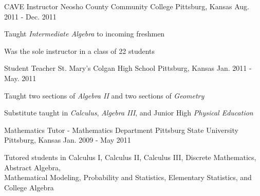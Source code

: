 \begin{cventries}
  \cventry
    {CAVE Instructor}
    {Neosho County Community College}
    {Pittsburg, Kansas}
    {Aug. 2011 - Dec. 2011}
    {
      \begin{cvitems}
        \item {Taught \textit{Intermediate Algebra} to incoming freshmen}
        \item {Was the sole instructor in a class of 22 students}
      \end{cvitems}
    }
    
  \cventry
    {Student Teacher}
    {St. Mary's Colgan High School}
    {Pittsburg, Kansas}
    {Jan. 2011 - May. 2011}
    {
      \begin{cvitems}
        \item {Taught two sections of \textit{Algebra II} and two sections of \textit{Geometry}}
        \item {Substitute taught in \textit{Calculus}, \textit{Algebra III}, and Junior High \textit{Physical Education}}
      \end{cvitems}
    }

  \cventry
    {Mathematics Tutor - Mathematics Department}
    {Pittsburg State University}
    {Pittsburg, Kansas}
    {Jan. 2009 - May 2011}
    {
      \begin{cvitems}
        \item {Tutored students in Calculus I, Calculus II, Calculus III, Discrete Mathematics, Abstract Algebra, \\ Mathematical Modeling, Probability and Statistics, Elementary Statistics, and College Algebra}
      \end{cvitems}
    }
\end{cventries}